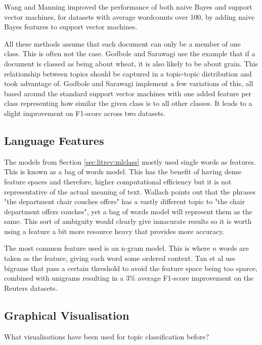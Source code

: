 			Wang and Manning improved the performance of both naive Bayes and support vector machines, for datasets with average wordcounts over 100, by adding naive Bayes features to support vector machines\cite{baselines_bigrams_wang}. 
			
			All these methods assume that each document can only be a member of one class. This is often not the case. Godbole and Sarawagi use the example that if a document is classed as being about wheat, it is also likely to be about grain\cite{discriminative_multilabel_godbole}. This relationship between topics should be captured in a topic-topic distribution and took advantage of. Godbole and Sarawagi implement a few variations of this, all based around the standard support vector machines with one added feature per class representing how similar the given class is to all other classes. It leads to a slight improvement on F1-score across two datasets.
			
		\subsection{Language Features} \label{sec:litrev:langfeat}	%
			The models from Section \ref{sec:litrev:mlclass} mostly used single words as features. This is known as a bag of words model. This has the benefit of having dense feature spaces and therefore, higher computational efficiency but it is not representative of the actual meaning of text. Wallach points out that the phrases "the department chair couches offers" has a vastly different topic to "the chair department offers couches", yet a bag of words model will represent them as the same\cite{beyond_bag_wallach}. This sort of ambiguity would clearly give innacurate results so it is worth using a feature a bit more resource heavy that provides more accuracy.
			
			The most common feature used is an n-gram model. This is where $n$ words are taken as the feature, giving each word some ordered context. Tan et al use bigrams that pass a certain threshold to avoid the feature space being too sparce, combined with unigrams resulting in a 3\% average F1-score improvement on the Reuters datasets\cite{bigrams_enhance_categorisation}.
		\subsection{Graphical Visualisation}
			What visualisations have been used for topic classification before?
			
